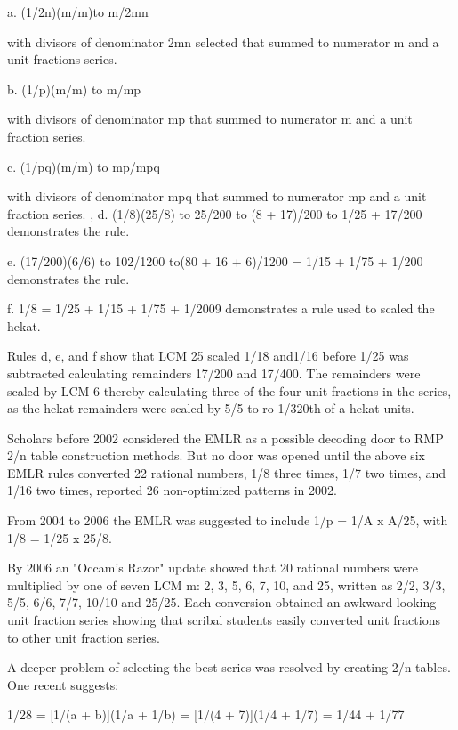 \documentclass[12pt]{article}
\begin{document}
a. (1/2n)(m/m)to m/2mn

with divisors of denominator 2mn selected that summed to numerator m and a unit fractions series.                       

b. (1/p)(m/m) to m/mp 

with divisors of denominator mp that summed to numerator m and a unit fraction series.

c. (1/pq)(m/m) to mp/mpq 

with divisors of denominator mpq that summed to numerator mp and a unit fraction series.
                                                          ,  
d. (1/8)(25/8) to 25/200 to (8 + 17)/200 to 1/25 + 17/200 demonstrates the rule.
                         
e. (17/200)(6/6) to 102/1200 to(80 + 16 + 6)/1200 = 1/15 + 1/75 + 1/200 demonstrates the rule.                  

f. 1/8 = 1/25 + 1/15 + 1/75 + 1/2009 demonstrates a  rule used to scaled the hekat.             
                        
Rules d, e, and f show that LCM 25 scaled 1/18 and1/16 before 1/25 was subtracted calculating remainders 17/200 and 17/400. The remainders were scaled by LCM 6 thereby calculating three of the four unit fractions in the series, as the hekat remainders were scaled by 5/5 to ro 1/320th of a hekat units. 

Scholars before 2002 considered the EMLR as a possible decoding door to RMP 2/n table construction methods.  But no door was opened until the above six EMLR rules converted 22 rational numbers, 1/8 three times, 1/7 two times, and 1/16 two times, reported 26 non-optimized patterns in 2002.

From 2004 to 2006 the EMLR was suggested to include 1/p = 1/A x A/25, with 1/8 = 1/25 x 25/8.  

By 2006 an "Occam's Razor" update showed that 20 rational numbers were multiplied by one of seven LCM m: 2, 3, 5, 6, 7, 10, and 25, written as 2/2, 3/3, 5/5, 6/6, 7/7, 10/10 and 25/25. Each conversion obtained an awkward-looking unit fraction series showing that scribal students easily converted unit fractions to other unit fraction series. 

A deeper problem of selecting the best series was resolved by creating 2/n tables. One recent  suggests: 

1/28 = [1/(a + b)](1/a + 1/b) = [1/(4 + 7)](1/4 + 1/7) = 1/44 + 1/77
\end{document}
